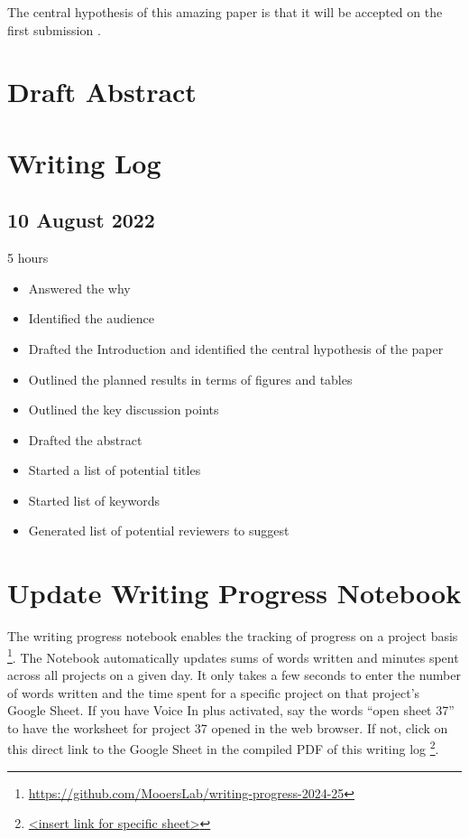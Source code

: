 \documentclass[10pt,letterpaper]{article}
\begin{document}
The central hypothesis of this amazing paper is that it will be accepted on the first submission \cite{chaloner1995bayesianexperimentaldesignareview}.


\section{Draft Abstract}



\section{Writing Log}

\subsection{10 August 2022}
5 hours

\begin{itemize}
  \item Answered the why
  \item Identified the audience
  \item Drafted the Introduction and identified the central hypothesis of the paper
  \item Outlined the planned results in terms of figures and tables
  \item Outlined the key discussion points
  \item Drafted the abstract
  \item Started a list of potential titles
  \item Started list of keywords
  \item Generated list of potential reviewers to suggest  
\end{itemize}

\section{Update Writing Progress Notebook}
The writing progress notebook enables the tracking of progress on a project basis \footnote{\url{https://github.com/MooersLab/writing-progress-2024-25}}.
The Notebook automatically updates sums of words written and minutes spent across all projects on a given day.
It only takes a few seconds to enter the number of words written and the time spent for a specific project on that project's Google Sheet. 
If you have Voice In plus activated, say the words ``open sheet 37'' to have the worksheet for project 37 opened in the web browser.
If not, click on this direct link to the Google Sheet in the compiled PDF of this writing log \footnote{\url{<insert link for specific sheet>}}.
\end{document}
